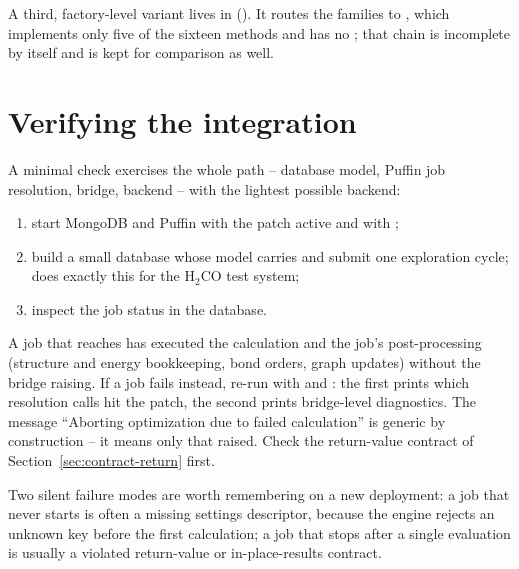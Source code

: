 A third, factory-level variant lives in 
().  It routes the families  to
, which implements only five of the sixteen
 methods and has no ; that chain is
incomplete by itself and is kept for comparison as well.

\section{Verifying the integration}
\label{sec:scine-verify}

A minimal check exercises the whole path -- database model, Puffin job
resolution, bridge, backend -- with the lightest possible backend:

\begin{enumerate}
  \item start MongoDB and Puffin with the patch active and with
        ;
  \item build a small database whose model carries
         and submit one exploration cycle;
         does exactly this for the H$_2$CO test
        system;
  \item inspect the job status in the database.
\end{enumerate}

\begin{readbox}
A job that reaches  has executed the calculation and the
job's post-processing (structure and energy bookkeeping, bond orders, graph
updates) without the bridge raising.  If a job fails instead, re-run with
 and :
the first prints which resolution calls hit the patch, the second prints
bridge-level diagnostics.  The message ``Aborting optimization due to failed
calculation'' is generic by construction -- it means only that
 raised.  Check the return-value contract of
Section~\ref{sec:contract-return} first.
\end{readbox}

Two silent failure modes are worth remembering on a new deployment: a job that
never starts is often a missing settings descriptor, because the engine
rejects an unknown key before the first calculation; a job that stops after a
single evaluation is usually a violated return-value or in-place-results
contract.
